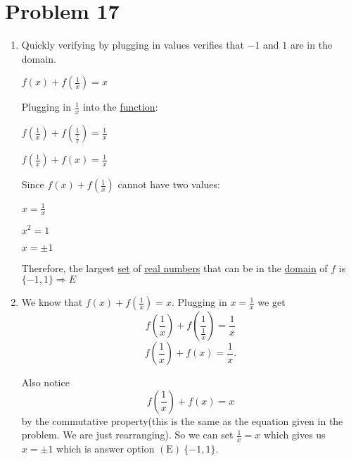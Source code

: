 \documentclass{article}%
\begin{document}
\section*{Problem 17}%
\label{sec:Problem17}%
\begin{enumerate}%
\item%
Quickly verifying by plugging in values verifies that $-1$ and $1$ are in the domain.

$f(x)+f\left(\frac{1}{x}\right)=x$

Plugging in $\frac{1}{x}$ into the \href{/wiki/index.php/Function}{function}: 

$f\left(\frac{1}{x}\right)+f\left(\frac{1}{\frac{1}{x}}\right)=\frac{1}{x}$

$f\left(\frac{1}{x}\right)+ f(x)= \frac{1}{x}$

Since $f(x) + f\left(\frac{1}{x}\right)$ cannot have two values: 

$x = \frac{1}{x}$

$x^2 = 1$

$x=\pm 1$

Therefore, the largest \href{/wiki/index.php/Set}{set} of \href{/wiki/index.php/Real_number}{real numbers} that can be in the \href{/wiki/index.php/Domain}{domain} of $f$ is $\{-1,1\} \Rightarrow E$

%
\item%
We know that $f(x) + f \left(\frac{1}{x}\right) = x.$ Plugging in $x = \frac{1}{x}$ we get \[f \left(\frac{1}{x}\right) + f \left(\frac{1}{\frac{1}{x}}\right) = \frac{1}{x}\] \[f \left(\frac{1}{x}\right) + f(x) = \frac{1}{x}.\]

Also notice \[f \left(\frac{1}{x}\right) + f(x) = x\] by the commutative property(this is the same as the equation given in the problem. We are just rearranging). So we can set $\frac{1}{x} = x$ which gives us $x = \pm 1$ which is answer option $\boxed{\mathrm{(E) \ }  \{-1,1\}}.$

%
\end{enumerate}

%
\end{document}
